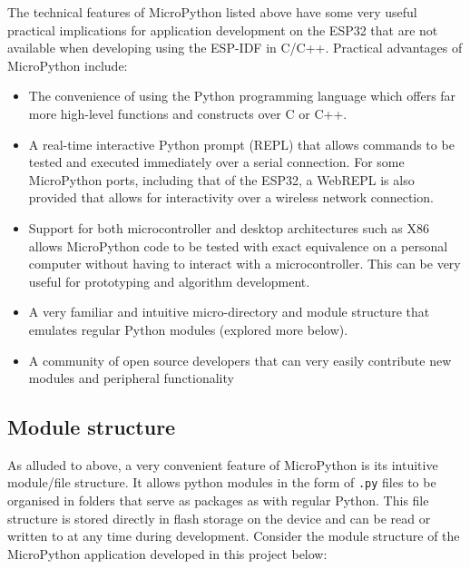 The technical features of MicroPython listed above have some very useful practical implications for application development on the ESP32 that are not available when developing using the ESP-IDF in C/C++. Practical advantages of MicroPython include:
\begin{itemize}
    \item The convenience of using the Python programming language which offers far more high-level functions and constructs over C or C++.
    \item A real-time interactive Python prompt (REPL) that allows commands to be tested and executed immediately over a serial connection. For some MicroPython ports, including that of the ESP32, a WebREPL is also provided that allows for interactivity over a wireless network connection.
    \item Support for both microcontroller and desktop architectures such as X86 allows MicroPython code to be tested with exact equivalence on a personal computer without having to interact with a microcontroller. This can be very useful for prototyping and algorithm development.
    \item A very familiar and intuitive micro-directory and module structure that emulates regular Python modules (explored more below).
    \item A community of open source developers that can very easily contribute new modules and peripheral functionality 
\end{itemize}

\subsection{Module structure}
As alluded to above, a very convenient feature of MicroPython is its intuitive module/file structure. It allows python modules in the form of \texttt{.py} files to be organised in folders that serve as packages as with regular Python. This file structure is stored directly in flash storage on the device and can be read or written to at any time during development. Consider the module structure of the MicroPython application developed in this project below:

